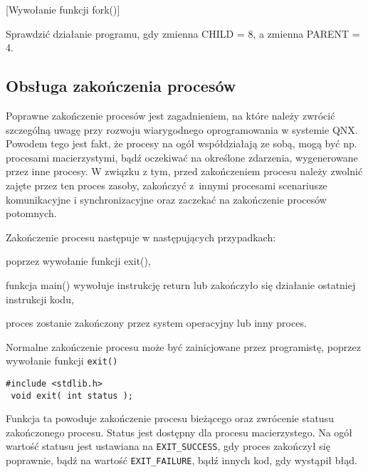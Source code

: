 \begin{example}{[Wywołanie funkcji fork()]}
  \label{ex:HP9M8}
  

  Sprawdzić działanie programu, gdy zmienna CHILD = 8, a zmienna PARENT = 4.
\end{example}

\subsection{Obsługa zakończenia procesów}

Poprawne zakończenie procesów jest zagadnieniem, na które należy zwrócić
szczególną uwagę przy rozwoju wiarygodnego oprogramowania w systemie QNX.
Powodem tego jest fakt, że procesy na ogół współdziałają ze sobą, mogą być np.
procesami macierzystymi, bądź oczekiwać na określone zdarzenia, wygenerowane
przez inne procesy. W związku z tym, przed zakończeniem procesu należy zwolnić
zajęte przez ten proces zasoby, zakończyć z innymi procesami scenariusze
komunikacyjne i synchronizacyjne oraz zaczekać na zakończenie procesów
potomnych.

Zakończenie procesu następuje w następujących przypadkach:
\begin{myitemize}
  \item poprzez wywołanie funkcji exit(),
  \item funkcja main() wywołuje instrukcję return lub zakończyło się działanie
        ostatniej instrukcji kodu,
  \item proces zostanie zakończony przez system operacyjny lub inny proces.
\end{myitemize}

Normalne zakończenie procesu może być zainicjowane przez programistę, poprzez
wywołanie funkcji \texttt{exit()}

\begin{lstlisting}[style=MyCStyle]
 #include <stdlib.h>
 void exit( int status );
\end{lstlisting}

Funkcja ta powoduje zakończenie procesu bieżącego oraz zwrócenie statusu
zakończonego procesu.  Status jest dostępny dla procesu macierzystego. Na ogół
wartość statusu jest ustawiana na \texttt{EXIT\_SUCCESS}, gdy proces zakończył
się poprawnie, bądź na wartość \texttt{EXIT\_FAILURE}, bądź innych kod, gdy
wystąpił błąd.

